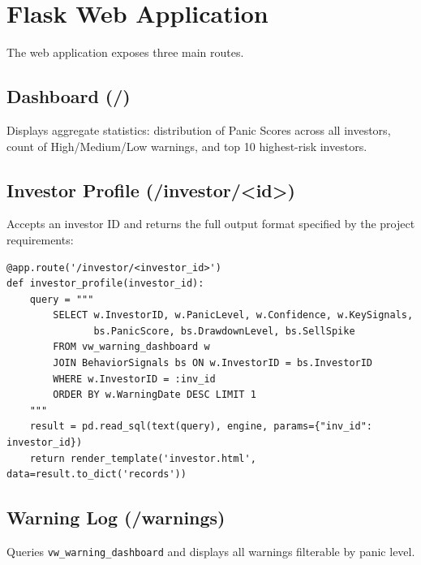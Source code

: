 \section{Flask Web Application}

The web application exposes three main routes.

\subsection{Dashboard (/)}

Displays aggregate statistics: distribution of Panic Scores across all investors, count of High/Medium/Low warnings, and top 10 highest-risk investors.

\subsection{Investor Profile (/investor/\textless id\textgreater)}

Accepts an investor ID and returns the full output format specified by the project requirements:

\begin{lstlisting}[style=pythonstyle, caption={Investor profile route}]
@app.route('/investor/<investor_id>')
def investor_profile(investor_id):
    query = """
        SELECT w.InvestorID, w.PanicLevel, w.Confidence, w.KeySignals,
               bs.PanicScore, bs.DrawdownLevel, bs.SellSpike
        FROM vw_warning_dashboard w
        JOIN BehaviorSignals bs ON w.InvestorID = bs.InvestorID
        WHERE w.InvestorID = :inv_id
        ORDER BY w.WarningDate DESC LIMIT 1
    """
    result = pd.read_sql(text(query), engine, params={"inv_id": investor_id})
    return render_template('investor.html', data=result.to_dict('records'))
\end{lstlisting}

\subsection{Warning Log (/warnings)}

Queries \texttt{vw\_warning\_dashboard} and displays all warnings filterable by panic level.

